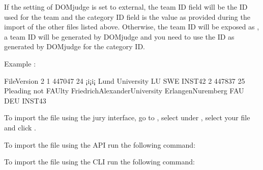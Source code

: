\documentclass[a4paper,10pt,english,openany]{sphinxmanual}
\begin{document}
\sphinxAtStartPar
If the  setting of DOMjudge is set to external, the team ID field will be the
ID used for the team and the category ID field is the value as provided during the import of
the other files listed above. Otherwise, the team ID will be exposed as , a
team ID will be generated by DOMjudge and you need to use the ID as generated by DOMjudge
for the category ID.

\sphinxAtStartPar
Example :

\begin{sphinxVerbatim}[commandchars=\\\{\}]
File\PYGZus{}Version   2
1    447047  24      ¡i¡i¡   Lund University LU      SWE     INST\PYGZhy{}42
2    447837  25      Pleading not FAUlty     Friedrich\PYGZhy{}Alexander\PYGZhy{}University Erlangen\PYGZhy{}Nuremberg       FAU     DEU     INST\PYGZhy{}43
\end{sphinxVerbatim}

\sphinxAtStartPar
To import the file using the jury interface, go to , select
 under , select your file and click .

\sphinxAtStartPar
To import the file using the API run the following command:

\begin{sphinxVerbatim}[commandchars=\\\{\}]
      
\end{sphinxVerbatim}

\sphinxAtStartPar
To import the file using the CLI run the following command:

\begin{sphinxVerbatim}[commandchars=\\\{\}]
      
\end{sphinxVerbatim}
\end{document}
